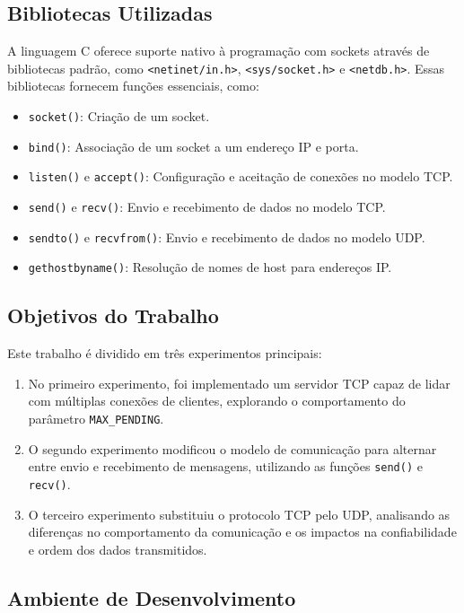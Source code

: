 \documentclass{article}
\begin{document}
\subsection{Bibliotecas Utilizadas}

A linguagem C oferece suporte nativo à programação com sockets através de bibliotecas padrão, como \texttt{<netinet/in.h>}, \texttt{<sys/socket.h>} e \texttt{<netdb.h>}. Essas bibliotecas fornecem funções essenciais, como:
\begin{itemize}
    \item \texttt{socket()}: Criação de um socket.
    \item \texttt{bind()}: Associação de um socket a um endereço IP e porta.
    \item \texttt{listen()} e \texttt{accept()}: Configuração e aceitação de conexões no modelo TCP.
    \item \texttt{send()} e \texttt{recv()}: Envio e recebimento de dados no modelo TCP.
    \item \texttt{sendto()} e \texttt{recvfrom()}: Envio e recebimento de dados no modelo UDP.
    \item \texttt{gethostbyname()}: Resolução de nomes de host para endereços IP.
\end{itemize}

\subsection{Objetivos do Trabalho}

Este trabalho é dividido em três experimentos principais:
\begin{enumerate}
    \item No primeiro experimento, foi implementado um servidor TCP capaz de lidar com múltiplas conexões de clientes, explorando o comportamento do parâmetro \texttt{MAX\_PENDING}.
    \item O segundo experimento modificou o modelo de comunicação para alternar entre envio e recebimento de mensagens, utilizando as funções \texttt{send()} e \texttt{recv()}.
    \item O terceiro experimento substituiu o protocolo TCP pelo UDP, analisando as diferenças no comportamento da comunicação e os impactos na confiabilidade e ordem dos dados transmitidos.
\end{enumerate}

\subsection{Ambiente de Desenvolvimento}
\end{document}
